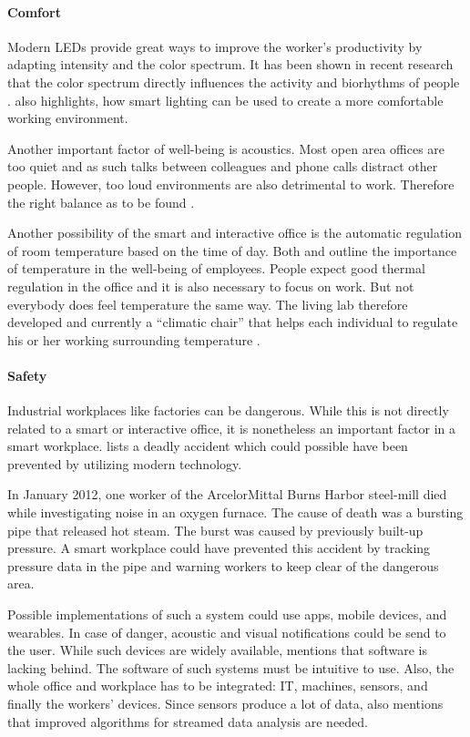 \paragraph{Comfort}\label{sec:sda-comfort}
Modern LEDs provide great ways to improve the worker's productivity by adapting intensity and the 
color spectrum. It has been shown in recent research that the color spectrum directly influences the 
activity and biorhythms of people  \cite{living-lab}. \cite{iotagenda} also highlights, how smart 
lighting can be used to create a more comfortable working environment.

Another important factor of well-being is acoustics. Most open area offices are too quiet and as 
such talks between colleagues and phone calls distract other people. However, too loud environments 
are also detrimental to work. Therefore the right balance as to be found \cite{living-lab}. 

Another possibility of the smart and interactive office is the automatic regulation of room 
temperature based on the time of day. Both \cite{iotagenda} and \cite{living-lab} outline the 
importance of temperature in the well-being of employees. People expect good thermal regulation in 
the office and it is also necessary to focus on work. But not everybody does feel temperature the 
same way. The living lab therefore developed and currently a ``climatic chair'' that helps each 
individual to regulate his or her working surrounding temperature \cite{living-lab}.


\paragraph{Safety}\label{sec:sda-safety}
Industrial workplaces like factories can be dangerous. While this is not directly related to a smart 
or interactive office, it is nonetheless an important factor in a smart workplace. \cite{sda-wired} 
lists a deadly accident which could possible have been prevented by utilizing modern technology.

In January 2012, one worker of the ArcelorMittal Burns Harbor steel-mill died while investigating 
noise in an oxygen furnace. The cause of death was a bursting pipe that released hot steam. The 
burst was caused by previously built-up pressure. A smart workplace could have prevented this 
accident by tracking pressure data in the pipe and warning workers to keep clear of the dangerous 
area.

Possible implementations of such a system could use apps, mobile devices, and wearables. In case of 
danger, acoustic and visual notifications could be send to the user. While such devices are widely 
available, \cite{sda-wired} mentions that software is lacking behind. The software of such systems 
must be intuitive to use. Also, the whole office and workplace has to be integrated: IT, machines, 
sensors, and finally the workers' devices. Since sensors produce a lot of data, \cite{sda-wired} 
also mentions that improved algorithms for streamed data analysis are needed.

